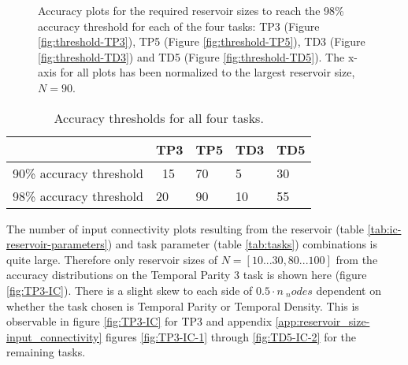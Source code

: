 \begin{figure}[ht]
    \centering
    \caption[Required reservoir sizes to reach the 98\% accuracy threshold for all tasks]{
        Accuracy plots for the required reservoir sizes to reach the 98\% accuracy threshold for each of the four tasks:
        TP3 (Figure \ref{fig:threshold-TP3}), TP5 (Figure \ref{fig:threshold-TP5}), TD3 (Figure \ref{fig:threshold-TD3}) and TD5 (Figure \ref{fig:threshold-TD5}).
        The x-axis for all plots has been normalized to the largest reservoir size, $N=90$.
    }
    \label{fig:accuracy-threshold-size}
    \resizebox{\textwidth}{!}{
        \subfloat[TP3, N=20]{
            
            \label{fig:threshold-TP3}
        }
        \subfloat[TP5, N=90]{
            
            \label{fig:threshold-TP5}
        }
    }
    \resizebox{\textwidth}{!}{
        \subfloat[TD3, N=10]{
            
            \label{fig:threshold-TD3}
        }
        \subfloat[TD5, N=55]{
            
            \label{fig:threshold-TD5}
        }
    }
\end{figure}

\begin{table}[ht]
    \centering
    \caption{Accuracy thresholds for all four tasks.}
    \label{tab:accuracy-thresholds}
    \begin{tabular}{lllll}
    \hline
    \hline
                            & \textbf{TP3} & \textbf{TP5} & \textbf{TD3} & \textbf{TD5} \\
    \hline
    90\% accuracy threshold & ~15 & 70  & 5   & 30  \\
    98\% accuracy threshold & 20  & 90  & 10  & 55  \\
    \hline
    \end{tabular}
\end{table}

The number of input connectivity plots resulting from the reservoir (table \ref{tab:ic-reservoir-parameters}) and task parameter (table \ref{tab:tasks}) combinations is quite large.
Therefore only reservoir sizes of $ N=[10...30, 80...100]$ from the accuracy distributions on the Temporal Parity 3 task is shown here (figure \ref{fig:TP3-IC}).
There is a slight skew to each side of $ 0.5 \cdot n\ _nodes $ dependent on whether the task chosen is Temporal Parity or Temporal Density.
This is observable in figure \ref{fig:TP3-IC} for TP3 and appendix \ref{app:reservoir_size-input_connectivity} figures \ref{fig:TP3-IC-1} through \ref{fig:TD5-IC-2} for the remaining tasks.

